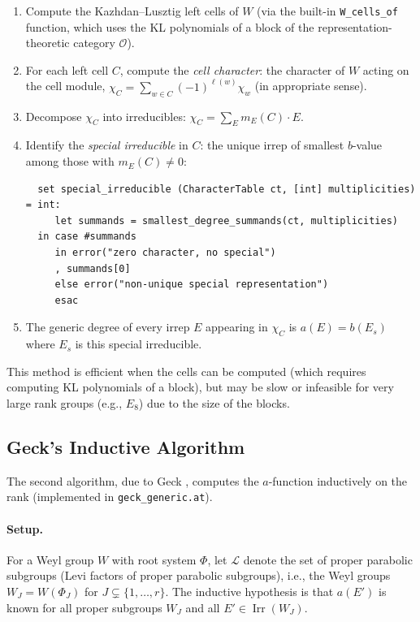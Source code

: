 \documentclass[12pt]{amsart}
\newcommand{\Irr}{\operatorname{Irr}}
\begin{document}
\begin{enumerate}
  \item Compute the Kazhdan--Lusztig left cells of $W$ (via the built-in
        \texttt{W\_cells\_of} function, which uses the KL polynomials of a
        block of the representation-theoretic category $\mathcal{O}$).
  \item For each left cell $C$, compute the \emph{cell character}: the
        character of $W$ acting on the cell module,
        $\chi_C = \sum_{w \in C} (-1)^{\ell(w)} \chi_w$ (in appropriate sense).
  \item Decompose $\chi_C$ into irreducibles: $\chi_C = \sum_E m_E(C) \cdot E$.
  \item Identify the \emph{special irreducible} in $C$: the unique irrep of
        smallest $b$-value among those with $m_E(C) \neq 0$:
        \begin{verbatim}
  set special_irreducible (CharacterTable ct, [int] multiplicities) = int:
     let summands = smallest_degree_summands(ct, multiplicities)
  in case #summands
     in error("zero character, no special")
     , summands[0]
     else error("non-unique special representation")
     esac
        \end{verbatim}
  \item The generic degree of every irrep $E$ appearing in $\chi_C$ is
        $a(E) = b(E_s)$ where $E_s$ is this special irreducible.
\end{enumerate}

This method is efficient when the cells can be computed (which requires
computing KL polynomials of a block), but may be slow or infeasible for very
large rank groups (e.g., $E_8$) due to the size of the blocks.

\subsection{Geck's Inductive Algorithm}

The second algorithm, due to Geck \cite{Geck:chevie}, computes the $a$-function
inductively on the rank (implemented in \texttt{geck\_generic.at}).

\paragraph{Setup.} For a Weyl group $W$ with root system $\Phi$, let
$\mathcal{L}$ denote the set of proper parabolic subgroups (Levi factors of
proper parabolic subgroups), i.e., the Weyl groups $W_J = W(\Phi_J)$ for
$J \subsetneq \{1, \ldots, r\}$.  The inductive hypothesis is that $a(E')$ is
known for all proper subgroups $W_J$ and all $E' \in \Irr(W_J)$.
\end{document}
